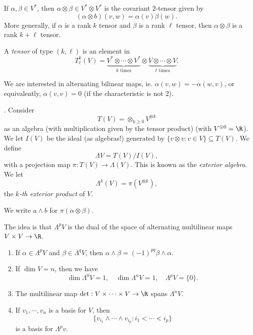 \documentclass[a4paper]{article}
\begin{document}
\begin{eg}
  If $\alpha, \beta \in V^*$, then $\alpha \otimes \beta \in V^* \otimes V^*$ is the covariant $2$-tensor given by
  \[
    (\alpha \otimes b)(v, w) = \alpha(v) \beta(w).
  \]
  More generally, if $\alpha$ is a rank $k$ tensor and $\beta$ is a rank $\ell$ tensor, then $\alpha \otimes \beta$ is a rank $k + \ell$ tensor.
\end{eg}

\begin{defi}[Tensor]
  A \emph{tensor} of type $(k, \ell)$ is an element in
  \[
    T^k_\ell(V) = \underbrace{V^* \otimes \cdots \otimes V^*}_{k\text{ times}} \otimes \underbrace{V \otimes \cdots \otimes V}_{\ell\text{ times}}.
  \]
\end{defi}
We are interested in alternating bilinear maps, ie. $\alpha(v, w) = - \alpha(w, v)$, or equivalently, $\alpha(v, v) = 0$ (if the characteristic is not $2$).

\begin{defi}.
  Consider
  \[
    T(V) = \otimes_{k \geq 0} V^{\otimes k}
  \]
  as an algebra (with multiplication given by the tensor product) (with $V^{\otimes 0} = \R$). We let $I(V)$ be the ideal (as algebras!) generated by $\{v \otimes v: v \in V\} \subseteq T(V)$. We define
  \[
    \Lambda V = T(V)/I(V),
  \]
  with a projection map $\pi: T(V) \to \Lambda(V)$. This is known as the \emph{exterior algebra}. We let
  \[
    \Lambda^k(V) = \pi(V^{\otimes k}),
  \]
  the \emph{$k$-th exterior product} of $V$.

  We write $a \wedge b$ for $\pi(\alpha \otimes \beta)$.
\end{defi}

The idea is that $\Lambda^p V$ is the dual of the space of alternating multilinear maps $V \times V\to \R$.

\begin{lemma}\leavevmode
  \begin{enumerate}
    \item If $\alpha \in \Lambda^p V$ and $\beta \in \Lambda^q V$, then $\alpha \wedge \beta = (-1)^{pq} \beta \wedge \alpha$.
    \item If $\dim V = n$, then we have
      \[
        \dim \Lambda^0 V = 1,\quad \dim \Lambda^n V = 1,\quad \Lambda^p V = \{0\}.
      \]
    \item The multilinear map $\det: V \times \cdots \times V \to \R$ spans $\Lambda^n V$.
    \item If $v_1, \cdots, v_n$ is a basis for $V$, then
      \[
        \{v_{i_1} \wedge \cdots \wedge v_{i_p}: i_1 < \cdots < i_p\}
      \]
      is a basis for $\Lambda^p v$.
  \end{enumerate}
\end{lemma}
\end{document}
